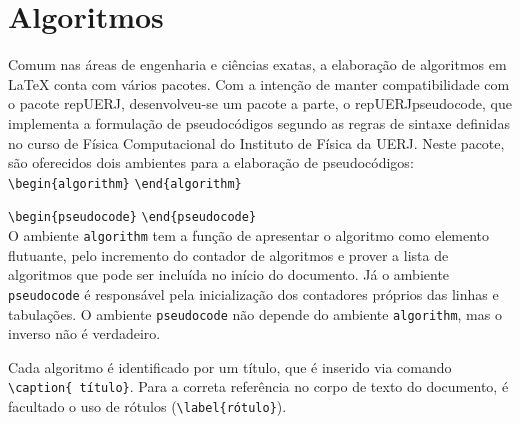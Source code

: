 \documentclass[a4paper,12pt,oneside,onecolumn,final,fleqn]{repUERJ}
\begin{document}
\chapter{Algoritmos}

Comum nas áreas de engenharia e ciências exatas, a elaboração de algoritmos em \LaTeX{} conta com vários pacotes. Com a intenção de manter compatibilidade com o pacote \textsf{repUERJ}, desenvolveu-se um pacote a parte, o \textsf{repUERJpseudocode}, que implementa a formulação de pseudocódigos segundo as regras de sintaxe definidas no curso de Física Computacional do Instituto de Física da UERJ. Neste pacote, são oferecidos dois ambientes para a elaboração de pseudocódigos:\\

\texttt{\textbackslash begin\{algorithm\}} \texttt{\textbackslash end\{algorithm\}}

\texttt{\textbackslash begin\{pseudocode\}} \texttt{\textbackslash end\{pseudocode\}}\\

O ambiente \texttt{algorithm} tem a função de apresentar o algoritmo como elemento flutuante, pelo incremento do contador de algoritmos e prover a lista de algoritmos que pode ser incluída no início do documento. Já o ambiente \texttt{pseudocode} é responsável pela inicialização dos contadores próprios das linhas e tabulações. O ambiente \texttt{pseudocode} não depende do ambiente  \texttt{algorithm}, mas o inverso não é verdadeiro.

Cada algoritmo é identificado por um título, que é inserido via comando \texttt{\textbackslash caption\{ tí\-tulo\}}. Para a correta referência no corpo de texto do documento, é facultado o uso de rótulos (\texttt{\textbackslash label\{rótulo\}}).
\end{document}
